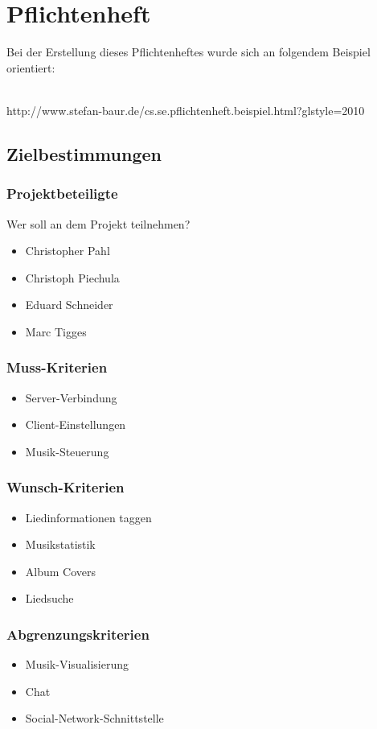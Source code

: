 \chapter{Pflichtenheft}
Bei der Erstellung dieses Pflichtenheftes wurde sich an folgendem Beispiel orientiert:\ \\ \\
\begin{center}
http://www.stefan-baur.de/cs.se.pflichtenheft.beispiel.html?glstyle=2010
\end{center}
\section{Zielbestimmungen}
\subsection{Projektbeteiligte}
Wer soll an dem Projekt teilnehmen?
\begin{itemize}
        \item Christopher Pahl
        \item Christoph Piechula
        \item Eduard Schneider
        \item Marc Tigges
\end{itemize}
\subsection{Muss-Kriterien}
\renewcommand{\labelitemi}{•}
\begin{itemize}
	\item Server-Verbindung
	\item Client-Einstellungen
	\item Musik-Steuerung
\end{itemize}
\subsection{Wunsch-Kriterien}
\begin{itemize}
	\item Liedinformationen taggen
	\item Musikstatistik
	\item Album Covers
	\item Liedsuche
\end{itemize}
\subsection{Abgrenzungskriterien}
\begin{itemize}
	\item Musik-Visualisierung
	\item Chat
	\item Social-Network-Schnittstelle
\end{itemize}
